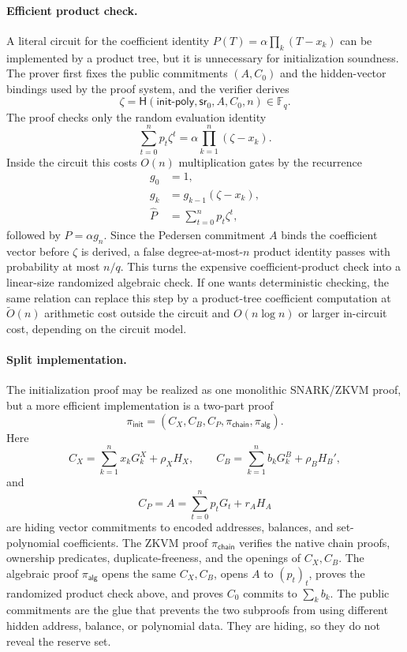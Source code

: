 \documentclass[runningheads]{llncs}
\newcommand{\F}{\mathbb{F}}
\newcommand{\sr}{\mathsf{sr}}
\newcommand{\softO}{\widetilde{O}}
\newcommand{\Hash}{\mathsf{H}}
\begin{document}
\paragraph{Efficient product check.}
A literal circuit for the coefficient identity \(P(T)=\alpha\prod_k(T-x_k)\) can be implemented by a product tree, but it is unnecessary for initialization soundness.  The prover first fixes the public commitments \((A,C_0)\) and the hidden-vector bindings used by the proof system, and the verifier derives
\[
        \zeta=\Hash(\mathsf{init\mbox{-}poly},\sr_0,A,C_0,n)\in\F_q .
\]
The proof checks only the random evaluation identity
\[
        \sum_{t=0}^n p_t\zeta^t
        =
        \alpha\prod_{k=1}^n(\zeta-x_k).
\]
Inside the circuit this costs \(O(n)\) multiplication gates by the recurrence
\[
\begin{aligned}
        g_0&=1,\\
        g_k&=g_{k-1}(\zeta-x_k),\\
        \widehat P&=\sum_{t=0}^n p_t\zeta^t,
\end{aligned}
\]
followed by \(\widehat P=\alpha g_n\).  Since the Pedersen commitment \(A\) binds the coefficient vector before \(\zeta\) is derived, a false degree-at-most-\(n\) product identity passes with probability at most \(n/q\).  This turns the expensive coefficient-product check into a linear-size randomized algebraic check.  If one wants deterministic checking, the same relation can replace this step by a product-tree coefficient computation at \(\softO(n)\) arithmetic cost outside the circuit and \(O(n\log n)\) or larger in-circuit cost, depending on the circuit model.

\paragraph{Split implementation.}
The initialization proof may be realized as one monolithic SNARK/ZKVM proof, but a more efficient implementation is a two-part proof
\[
        \pi_{\mathsf{init}}=(C_X,C_B,C_P,\pi_{\mathsf{chain}},\pi_{\mathsf{alg}}).
\]
Here
\[
        C_X=\sum_{k=1}^n x_kG_k^X+\rho_XH_X,
        \qquad
        C_B=\sum_{k=1}^n b_kG_k^B+\rho_BH_B',
\]
and
\[
        C_P=A=\sum_{t=0}^np_tG_t+r_AH_A
\]
are hiding vector commitments to encoded addresses, balances, and set-polynomial coefficients.  The ZKVM proof \(\pi_{\mathsf{chain}}\) verifies the native chain proofs, ownership predicates, duplicate-freeness, and the openings of \(C_X,C_B\).  The algebraic proof \(\pi_{\mathsf{alg}}\) opens the same \(C_X,C_B\), opens \(A\) to \((p_t)_t\), proves the randomized product check above, and proves \(C_0\) commits to \(\sum_kb_k\).  The public commitments are the glue that prevents the two subproofs from using different hidden address, balance, or polynomial data.  They are hiding, so they do not reveal the reserve set.
\end{document}
